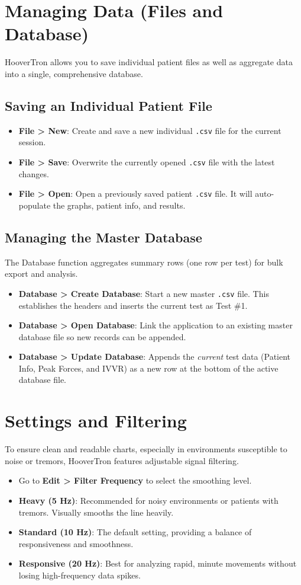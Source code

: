 \documentclass[11pt,a4paper]{article}
\begin{document}
\section{Managing Data (Files and Database)}
HooverTron allows you to save individual patient files as well as aggregate data into a single, comprehensive database.

\subsection{Saving an Individual Patient File}
\begin{itemize}
    \item \textbf{File > New}: Create and save a new individual \texttt{.csv} file for the current session.
    \item \textbf{File > Save}: Overwrite the currently opened \texttt{.csv} file with the latest changes.
    \item \textbf{File > Open}: Open a previously saved patient \texttt{.csv} file. It will auto-populate the graphs, patient info, and results.
\end{itemize}

\subsection{Managing the Master Database}
The Database function aggregates summary rows (one row per test) for bulk export and analysis.
\begin{itemize}
    \item \textbf{Database > Create Database}: Start a new master \texttt{.csv} file. This establishes the headers and inserts the current test as Test \#1.
    \item \textbf{Database > Open Database}: Link the application to an existing master database file so new records can be appended.
    \item \textbf{Database > Update Database}: Appends the \textit{current} test data (Patient Info, Peak Forces, and IVVR) as a new row at the bottom of the active database file.
\end{itemize}

\section{Settings and Filtering}
To ensure clean and readable charts, especially in environments susceptible to noise or tremors, HooverTron features adjustable signal filtering.

\begin{itemize}
    \item Go to \textbf{Edit > Filter Frequency} to select the smoothing level.
    \item \textbf{Heavy (5 Hz)}: Recommended for noisy environments or patients with tremors. Visually smooths the line heavily.
    \item \textbf{Standard (10 Hz)}: The default setting, providing a balance of responsiveness and smoothness.
    \item \textbf{Responsive (20 Hz)}: Best for analyzing rapid, minute movements without losing high-frequency data spikes.
\end{itemize}
\end{document}
